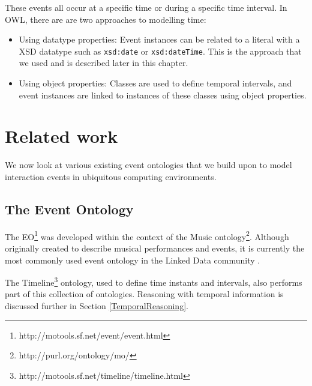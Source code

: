 



These events all occur at a specific time or during a specific time interval. In \ac{OWL}, there are are two approaches to modelling time:

\begin{itemize}
	\item Using datatype properties: Event instances can be related to a literal with a \ac{XSD} datatype such as \texttt{xsd:date} or \texttt{xsd:dateTime}. This is the approach that we used and is described later in this chapter.
	\item Using object properties: Classes are used to define temporal intervals, and event instances are linked to instances of these classes using object properties.
\end{itemize}


\section{Related work}
We now look at various existing event ontologies that we build upon to model interaction events in ubiquitous computing environments.

\subsection{The Event Ontology}
The \ac{EO}\footnote{http://motools.sf.net/event/event.html} was developed within the context of the Music ontology\footnote{http://purl.org/ontology/mo/}. Although originally created to describe musical performances and events, it is currently the most commonly used event ontology in the Linked Data community \cite{Shaw2009}.

The Timeline\footnote{http://motools.sf.net/timeline/timeline.html} ontology, used to define time instants and intervals, also performs part of this collection of ontologies. Reasoning with temporal information is discussed further in Section \ref{TemporalReasoning}.  

